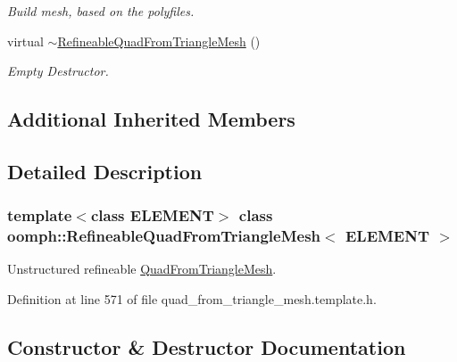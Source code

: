\begin{DoxyCompactItemize}
\begin{DoxyCompactList}\small\item\em Build mesh, based on the polyfiles. \end{DoxyCompactList}\item 
virtual \hyperlink{classoomph_1_1RefineableQuadFromTriangleMesh_aaa5c1de240765e38b30f2a10613faf59}{$\sim$\+Refineable\+Quad\+From\+Triangle\+Mesh} ()
\begin{DoxyCompactList}\small\item\em Empty Destructor. \end{DoxyCompactList}\end{DoxyCompactItemize}
\subsection*{Additional Inherited Members}


\subsection{Detailed Description}
\subsubsection*{template$<$class E\+L\+E\+M\+E\+NT$>$\newline
class oomph\+::\+Refineable\+Quad\+From\+Triangle\+Mesh$<$ E\+L\+E\+M\+E\+N\+T $>$}

Unstructured refineable \hyperlink{classoomph_1_1QuadFromTriangleMesh}{Quad\+From\+Triangle\+Mesh}. 

Definition at line 571 of file quad\+\_\+from\+\_\+triangle\+\_\+mesh.\+template.\+h.



\subsection{Constructor \& Destructor Documentation}
\mbox{\label{classoomph_1_1RefineableQuadFromTriangleMesh_a76122fefb9de7f79d3f8093f730c3dd4}} 
